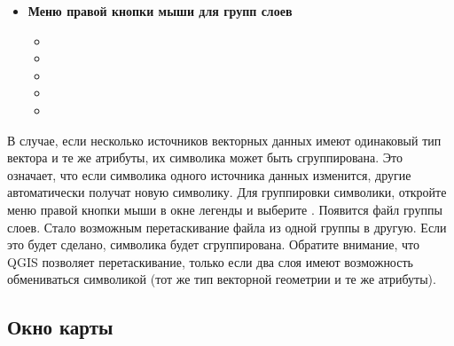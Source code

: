 \begin{itemize}
\item \textbf{Меню правой кнопки мыши для групп слоев}
\begin{itemize}
\item {}
\item {}
\item {}
\item {}
\item {}
\end{itemize}

\end{itemize}

В случае, если несколько источников векторных данных имеют одинаковый
тип вектора и те же атрибуты, их символика может быть сгруппирована.
Это означает, что если символика одного источника данных изменится,
другие автоматически получат новую символику. Для группировки символики,
откройте меню правой кнопки мыши в окне легенды и выберите
. Появится файл группы слоев. Стало
возможным перетаскивание файла из одной группы в другую. Если это будет
сделано, символика будет сгруппирована. Обратите внимание, что QGIS
позволяет перетаскивание, только если два слоя имеют возможность
обмениваться символикой (тот же тип векторной геометрии и те же атрибуты).

%

\subsection{Окно карты}\label{label_mapview}

